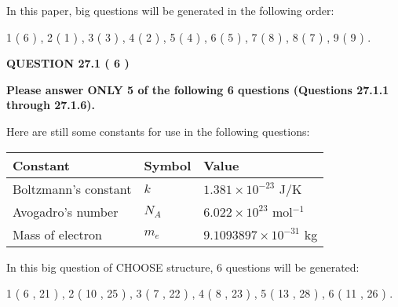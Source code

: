 \documentclass[12pt]{article}
\begin{document}
\vspace{0.3in}
 
 
   
   
   
\vspace{0.2in}
   
In this paper, big questions will be generated in the following order: 
   
   
             1 (           6 )
 ,
             2 (           1 )
 ,
             3 (           3 )
 ,
             4 (           2 )
 ,
             5 (           4 )
 ,
             6 (           5 )
 ,
             7 (           8 )
 ,
             8 (           7 )
 ,
             9 (           9 )
 .
  
\vspace{0.2in}
  
{\textbf{\Large{QUESTION
27.1 
 (           6 )
}}}
  
  
 
{\textbf{\Large{Please answer ONLY
5 of the following
6 questions (Questions
27.1.1 through
27.1.6). }}}
 
Here are still some constants for use in the following questions:
 
 
\noindent\begin{tabular}{|l|l|l|}
\hline
Constant & Symbol & Value \\
\hline
 
Boltzmann's constant &
$k$ &
 $ 1.381 \times 10^{-23} $
J/K \\
\hline
 
Avogadro's number &
$N_A$ &
 $ 6.022 \times 10^{23} $
mol$^{-1}$ \\
\hline
 
Mass of electron &
$m_e$ &
 $ 9.1093897 \times 10^{-31} $
kg \\
\hline
 
\end{tabular}
 
   
\vspace{0.2in}
   
 In this big question of CHOOSE structure,            6  questions will be generated: 
  
  
             1 (           6 ,          21 )
 ,
             2 (          10 ,          25 )
 ,
             3 (           7 ,          22 )
 ,
             4 (           8 ,          23 )
 ,
             5 (          13 ,          28 )
 ,
             6 (          11 ,          26 )
 .
  
\vspace{0.2in}
  
\end{document}

